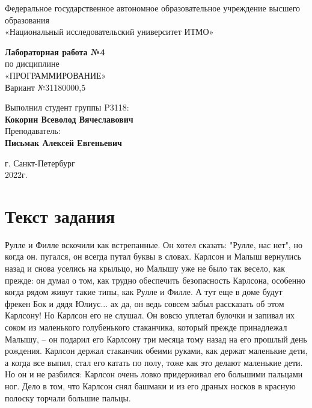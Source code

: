 \documentclass[12pt,onecolumn]{article}
\begin{document}
\begin{center}
    Федеральное государственное автономное образовательное учреждение высшего образования\\
	«Национальный исследовательский университет ИТМО»
\end{center}
\vspace{1cm}


\begin{center}
    \large \textbf{Лабораторная работа №4}\\
    по дисциплине\\
    «ПРОГРАММИРОВАНИЕ»\\
	\vspace{1cm}
    Вариант №31180000,5\\
\end{center}

\vspace{10cm}
\begin{flushright}
  Выполнил студент  группы P3118: \\
  \textbf{Кокорин Всеволод Вячеславович}\\
  Преподаватель: \\
  \textbf{Письмак Алексей Евгеньевич}\\
\end{flushright}

\vspace{5cm}
\begin{center}
    г. Санкт-Петербург\\
    2022г.
\end{center}
\newpage
\tableofcontents
\newpage
\section{Текст задания}
Рулле и Филле вскочили как встрепанные. Он хотел сказать: "Рулле, нас нет", но когда он. пугался, он всегда путал буквы в словах. Карлсон и Малыш вернулись назад и снова уселись на крыльцо, но Малышу уже не было так весело, как прежде: он думал о том, как трудно обеспечить безопасность Карлсона, особенно когда рядом живут такие типы, как Рулле и Филле. А тут еще в доме будут фрекен Бок и дядя Юлиус... ах да, он ведь совсем забыл рассказать об этом Карлсону! Но Карлсон его не слушал. Он вовсю уплетал булочки и запивал их соком из маленького голубенького стаканчика, который прежде принадлежал Малышу, -- он подарил его Карлсону три месяца тому назад на его прошлый день рождения. Карлсон держал стаканчик обеими руками, как держат маленькие дети, а когда все выпил, стал его катать по полу, тоже как это делают маленькие дети. Но он и не разбился: Карлсон очень ловко придерживал его большими пальцами ног. Дело в том, что Карлсон снял башмаки и из его драных носков в красную полоску торчали большие пальцы. 
\newpage
\end{document}

